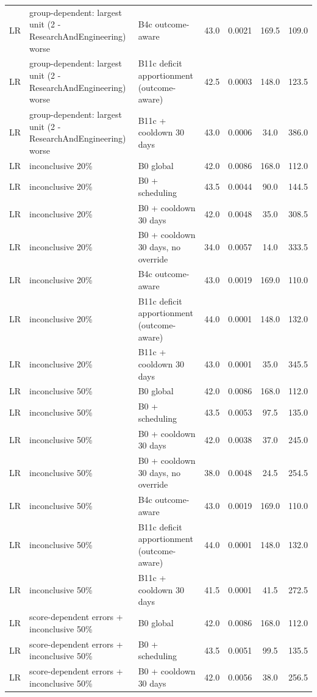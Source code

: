 \documentclass[10pt,onecolumn,letterpaper]{article}
\begin{document}
\begin{longtable}{lp{5.2cm}p{4.4cm}cccc}
LR & group-dependent: largest unit (2 - ResearchAndEngineering) worse & B4c outcome-aware & 43.0 & 0.0021 & 169.5 & 109.0 \\
LR & group-dependent: largest unit (2 - ResearchAndEngineering) worse & B11c deficit apportionment (outcome-aware) & 42.5 & 0.0003 & 148.0 & 123.5 \\
LR & group-dependent: largest unit (2 - ResearchAndEngineering) worse & B11c + cooldown 30 days & 43.0 & 0.0006 & 34.0 & 386.0 \\
LR & inconclusive 20\% & B0 global & 42.0 & 0.0086 & 168.0 & 112.0 \\
LR & inconclusive 20\% & B0 + scheduling & 43.5 & 0.0044 & 90.0 & 144.5 \\
LR & inconclusive 20\% & B0 + cooldown 30 days & 42.0 & 0.0048 & 35.0 & 308.5 \\
LR & inconclusive 20\% & B0 + cooldown 30 days, no override & 34.0 & 0.0057 & 14.0 & 333.5 \\
LR & inconclusive 20\% & B4c outcome-aware & 43.0 & 0.0019 & 169.0 & 110.0 \\
LR & inconclusive 20\% & B11c deficit apportionment (outcome-aware) & 44.0 & 0.0001 & 148.0 & 132.0 \\
LR & inconclusive 20\% & B11c + cooldown 30 days & 43.0 & 0.0001 & 35.0 & 345.5 \\
LR & inconclusive 50\% & B0 global & 42.0 & 0.0086 & 168.0 & 112.0 \\
LR & inconclusive 50\% & B0 + scheduling & 43.5 & 0.0053 & 97.5 & 135.0 \\
LR & inconclusive 50\% & B0 + cooldown 30 days & 42.0 & 0.0038 & 37.0 & 245.0 \\
LR & inconclusive 50\% & B0 + cooldown 30 days, no override & 38.0 & 0.0048 & 24.5 & 254.5 \\
LR & inconclusive 50\% & B4c outcome-aware & 43.0 & 0.0019 & 169.0 & 110.0 \\
LR & inconclusive 50\% & B11c deficit apportionment (outcome-aware) & 44.0 & 0.0001 & 148.0 & 132.0 \\
LR & inconclusive 50\% & B11c + cooldown 30 days & 41.5 & 0.0001 & 41.5 & 272.5 \\
LR & score-dependent errors + inconclusive 50\% & B0 global & 42.0 & 0.0086 & 168.0 & 112.0 \\
LR & score-dependent errors + inconclusive 50\% & B0 + scheduling & 43.5 & 0.0051 & 99.5 & 135.5 \\
LR & score-dependent errors + inconclusive 50\% & B0 + cooldown 30 days & 42.0 & 0.0056 & 38.0 & 256.5 \\

\end{longtable}
\end{document}
